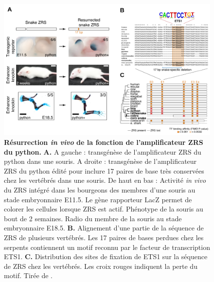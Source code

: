 \begin{figure}[h]
    \centering
    \includegraphics[width=1\textwidth, page=1] {figures/introduction/fig34.png}
    \caption[Résurrection \textit{in vivo} de la fonction de l'amplificateur \acrshort{ZRS} du python.]{
    \textbf{Résurrection \textit{in vivo} de la fonction de l'amplificateur \acrshort{ZRS} du python.}
    \textbf{A.} A gauche : transgénèse de l'\gls{amplificateur} \acrshort{ZRS} du python dans une souris. A droite : transgénèse de l'\gls{amplificateur} \acrshort{ZRS} du python édité pour inclure 17 paires de base très conservées chez les vertébrés dans une souris. De haut en bas : Activité \textit{in vivo} du \acrshort{ZRS} intégré dans les bourgeons des membres d'une souris au stade embryonnaire E11.5. Le gène rapporteur LacZ permet de colorer les cellules lorsque \acrshort{ZRS} est actif. Phénotype de la souris au bout de 2 semaines. Radio du membre de la souris au stade embryonnaire E18.5. 
    \textbf{B.} Alignement d'une partie de la séquence de \acrshort{ZRS} de plusieurs vertébrés. Les 17 paires de bases perdues chez les serpents contiennent un motif reconnu par le facteur de transcription ETS1. 
    \textbf{C.} Distribution des sites de fixation de ETS1 sur la séquence de \acrshort{ZRS} chez les vertébrés. Les croix rouges indiquent la perte du motif. Tirée de \citep{kvon_progressive_2016}. \\
    }
    \label{fig:Fig34}
\end{figure}

